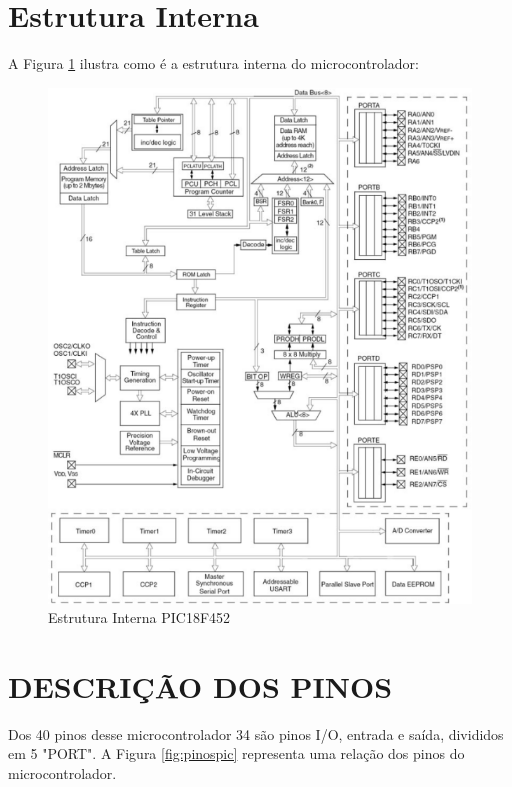 \newpage 
\section{Estrutura Interna}
A Figura \ref{fig:estuturapic} ilustra como é a estrutura interna do microcontrolador:

\begin{figure}[htp]
	\centering
	\includegraphics[scale=0.6]{images/estrutura_pic.png}
	\caption{Estrutura Interna PIC18F452}	
	\label{fig:estuturapic}	
\end{figure}

\newpage 
\section{DESCRIÇÃO DOS PINOS}
Dos 40 pinos desse microcontrolador 34 são pinos I/O, entrada e saída, divididos em 5 "PORT". A Figura \ref{fig:pinospic} representa uma relação dos pinos do microcontrolador.

